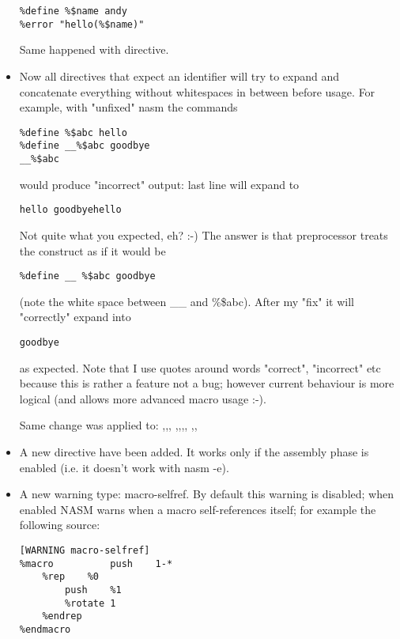 \begin{itemize}
{\begin{lstlisting}
%define %$name andy
%error "hello(%$name)"
\end{lstlisting}
        Same happened with  directive.}
    \item{Now all directives that expect an identifier will try to expand and
        concatenate everything without whitespaces in between before usage.
        For example, with "unfixed" nasm the commands
\begin{lstlisting}
%define %$abc hello
%define __%$abc goodbye
__%$abc
\end{lstlisting}
        would produce "incorrect" output: last line will expand to
\begin{lstlisting}
hello goodbyehello
\end{lstlisting}
        Not quite what you expected, eh? :-) The answer is that preprocessor
        treats the  construct as if it would be
\begin{lstlisting}
%define __ %$abc goodbye
\end{lstlisting}
        (note the white space between \_\_ and \%\$abc). After my "fix" it
        will "correctly" expand into
\begin{lstlisting}
goodbye
\end{lstlisting}
        as expected. Note that I use quotes around words "correct", "incorrect"
        etc because this is rather a feature not a bug; however current behaviour
        is more logical (and allows more advanced macro usage :-).

        Same change was applied to: ,,,
        ,,,,
        ,,}
    \item{A new directive  have been added. It works only
        if the assembly phase is enabled (i.e. it doesn't work with nasm -e).}
    \item{A new warning type: macro-selfref. By default this warning is disabled;
        when enabled NASM warns when a macro self-references itself; for example
        the following source:
\begin{lstlisting}
[WARNING macro-selfref]
%macro          push    1-*
    %rep    %0
        push    %1
        %rotate 1
    %endrep
%endmacro


\end{lstlisting}}
\end{itemize}
